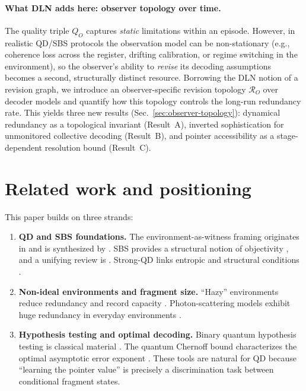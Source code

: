 \documentclass[11pt]{article}
\newcommand{\cR}{\mathcal{R}}
\newcommand{\1}{\mathbf{1}}
\theoremstyle{definition}
\theoremstyle{plain}
\begin{document}
\paragraph{What DLN adds here: observer topology over time.}
The quality triple $Q_O$ captures \emph{static} limitations within an episode. However, in realistic QD/SBS protocols the observation model can be non-stationary (e.g., coherence loss across the register, drifting calibration, or regime switching in the environment), so the observer's ability to \emph{revise} its decoding assumptions becomes a second, structurally distinct resource. Borrowing the DLN notion of a revision graph, we introduce an observer-specific revision topology $\cR_O$ over decoder models and quantify how this topology controls the long-run redundancy rate. This yields three new results (Sec.~\ref{sec:observer-topology}): dynamical redundancy as a topological invariant (Result~A), inverted sophistication for unmonitored collective decoding (Result~B), and pointer accessibility as a stage-dependent resolution bound (Result~C).

\section{Related work and positioning}

This paper builds on three strands:

\begin{enumerate}[leftmargin=2em]
\item \textbf{QD and SBS foundations.}
The environment-as-witness framing originates in \citet{OPZ2004} and is synthesized by \citet{Zurek2009,BlumeKohoutZurek2006}.
SBS provides a structural notion of objectivity \citep{HorodeckiKorbiczHorodecki2015}, and a unifying review is \citet{KorbiczReview2021}.
Strong-QD links entropic and structural conditions \citep{LeOlayaCastro2019}.
\item \textbf{Non-ideal environments and fragment size.}
``Hazy'' environments reduce redundancy and record capacity \citep{ZwolakQuanZurek2009}.
Photon-scattering models exhibit huge redundancy in everyday environments \citep{RiedelZurek2010,RiedelZurek2011}.
\item \textbf{Hypothesis testing and optimal decoding.}
Binary quantum hypothesis testing is classical material \citep{Helstrom1976,Watrous2018}.
The quantum Chernoff bound characterizes the optimal asymptotic error exponent \citep{Audenaert2007,NussbaumSzkola2009}.
These tools are natural for QD because ``learning the pointer value'' is precisely a discrimination task between conditional fragment states.
\end{enumerate}
\end{document}
